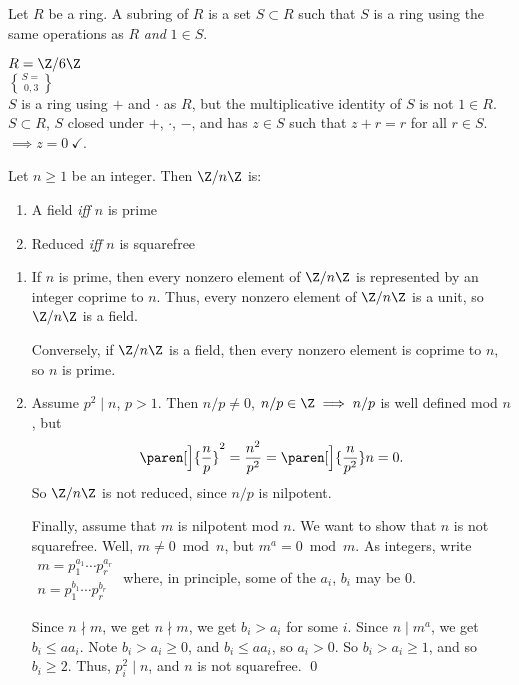  Let $R$ be a ring.  A subring of $R$ is a set $S\subset R$ such that $S$ is a ring using the same operations as $R$ \emph{and} $1\in S$.

\eg $R=\Z/6\Z$ \\
$S=\brace{0,3}$ \\
$S$ is a ring using $+$ and $\cdot$ as $R$, but the multiplicative identity of $S$ is not $1\in R$. \\
$S\subset R$, $S$ closed under $+$, $\cdot$, $-$, and has $z\in S$ such that $z+r=r$ for all $r\in S$. \\
$\implies z=0~\checkmark$.

\thm Let $n\geq1$ be an integer.  Then $\Z/n\Z$ is:
\begin{enumerate}[label=(\arabic*)]
\item A field \emph{iff} $n$ is prime
\item Reduced \emph{iff} $n$ is squarefree
\end{enumerate}
\pf\begin{enumerate}[label=(\arabic*)]
\item If $n$ is prime, then every nonzero element of $\Z/n\Z$ is represented by an integer coprime to $n$.  Thus, every nonzero element of $\Z/n\Z$ is a unit, so $\Z/n\Z$ is a field.

Conversely, if $\Z/n\Z$ is a field, then every nonzero element is coprime to $n$, so $n$ is prime.
\item Assume $p^2\mid n$, $p>1$.  Then $n/p\neq0$, $n/p\in\Z\implies n/p$ is well defined mod $n$, but
\[ \paren[\Big]{\frac{n}{p}}^2 = \frac{n^2}{p^2} = \paren[\Big]{\frac{n}{p^2}}n = 0 . \]
So $\Z/n\Z$ is not reduced, since $n/p$ is nilpotent.

Finally, assume that $m$ is nilpotent mod $n$.  We want to show that $n$ is not squarefree.  Well, $m\neq0\bmod n$, but $m^a=0\bmod m$.  As integers, write $\substack{m = p_1^{a_1}\dotsm p_r^{a_r} \\ n = p_1^{b_1} \dotsm p_r^{b_r}}$ where, in principle, some of the $a_i$, $b_i$ may be $0$.

Since $n\nmid m$, we get $n\nmid m$, we get $b_i>a_i$ for some $i$.  Since $n\mid m^a$, we get $b_i\leq aa_i$.  Note $b_i>a_i\geq0$, and $b_i\leq aa_i$, so $a_i>0$.  So $b_i>a_i\geq1$, and so $b_i\geq2$.  Thus, $p_i^2\mid n$, and $n$ is not squarefree. \qed
\end{enumerate}%
